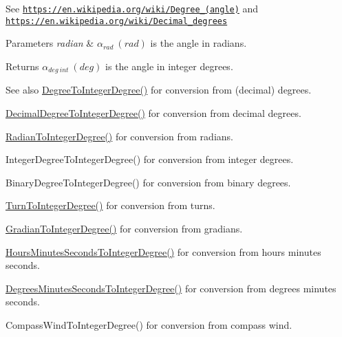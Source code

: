 See \href{https://en.wikipedia.org/wiki/Degree_(angle)}{\tt https\+://en.\+wikipedia.\+org/wiki/\+Degree\+\_\+(angle)} and \href{https://en.wikipedia.org/wiki/Decimal_degrees}{\tt https\+://en.\+wikipedia.\+org/wiki/\+Decimal\+\_\+degrees} 
\begin{DoxyParams}{Parameters}
{\em radian} & $\alpha_{rad}\ (rad)$ is the angle in radians. \\
\hline
\end{DoxyParams}
\begin{DoxyReturn}{Returns}
$\alpha_{deg\ int}\ (deg)$ is the angle in integer degrees. 
\end{DoxyReturn}
\begin{DoxySeeAlso}{See also}
\mbox{\hyperlink{group___e_g_x_math-_angle_conversions-_degree_gaabd20f21be3c18ee423d0bc1a677c6f6}{Degree\+To\+Integer\+Degree()}} for conversion from (decimal) degrees. 

\mbox{\hyperlink{group___e_g_x_math-_angle_conversions-_decimal_degree_ga115239ea7202dbc6a6c9fba68e0ac189}{Decimal\+Degree\+To\+Integer\+Degree()}} for conversion from decimal degrees. 

\mbox{\hyperlink{group___e_g_x_math-_angle_conversions-_radian_gac84796dfdeb56235e1e338522a5f9350}{Radian\+To\+Integer\+Degree()}} for conversion from radians. 

Integer\+Degree\+To\+Integer\+Degree() for conversion from integer degrees. 

Binary\+Degree\+To\+Integer\+Degree() for conversion from binary degrees. 

\mbox{\hyperlink{group___e_g_x_math-_angle_conversions-_turn_ga999085c62490997da870618e20e88ebb}{Turn\+To\+Integer\+Degree()}} for conversion from turns. 

\mbox{\hyperlink{group___e_g_x_math-_angle_conversions-_gradian_ga555aae885f8a7d0876a36aa07cbbd816}{Gradian\+To\+Integer\+Degree()}} for conversion from gradians. 

\mbox{\hyperlink{group___e_g_x_math-_angle_conversions-_hours_minutes_seconds_gadf3829ca1704cfd64886a4de1b3e366f}{Hours\+Minutes\+Seconds\+To\+Integer\+Degree()}} for conversion from hours minutes seconds. 

\mbox{\hyperlink{group___e_g_x_math-_angle_conversions-_degrees_minutes_seconds_ga973287a878e521e3c1d4d1f973ecdcfe}{Degrees\+Minutes\+Seconds\+To\+Integer\+Degree()}} for conversion from degrees minutes seconds. 

Compass\+Wind\+To\+Integer\+Degree() for conversion from compass wind. 
\end{DoxySeeAlso}
\mbox{\label{group___e_g_x_math-_angle_conversions-_radian_ga3a515ca2838a305fa40750763f546a86}} 

